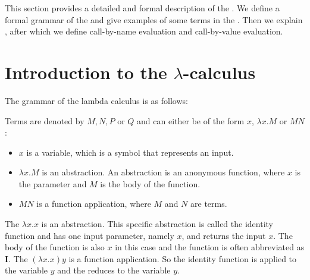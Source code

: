 


This section provides a detailed and formal description of the \lc. We define a formal grammar of the \lc and give examples of some terms in the \lc.
Then we explain \br, after which we define call-by-name evaluation and call-by-value evaluation.


\section{\texorpdfstring{Introduction to the \boldmath$\lambda$-calculus}{Introduction to the Lambda Calculus}}
The grammar of the lambda calculus is as follows:

\vspace{10pt}
\begin{grammar}{
	}
\end{grammar}

\vspace{10pt}
Terms are denoted by $M, N, P$ or $Q$ and can either be of the form $x$, $\lambda x.M$ or $M N$:
\begin{itemize}[noitemsep]
	\item $x$ is a variable, which is a symbol that represents an input.
	\item $\lambda x.M$ is an abstraction. An abstraction is an anonymous function, where $x$ is the parameter and $M$ is the body of the function.
	\item $M N$ is a function application, where $M$ and $N$ are terms.
\end{itemize}

The \lterm $\lambda x. x$ is an abstraction. This specific abstraction is called the identity function and has one input parameter, namely $x$, and returns the input $x$.
The body of the function is also $x$ in this case and the function is often abbreviated as $\mathbf{I}$. 
The \lterm $(\lambda x. x) y$ is a function application. So the identity function is applied to the variable $y$ and the \lterm reduces to the variable $y$.
